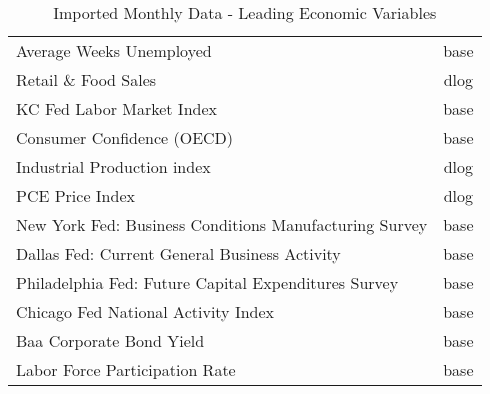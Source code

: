 \documentclass[11pt, letterpaper]{article}\usepackage[]{graphicx}\usepackage[]{color}
\begin{document}
\begin{table}[H]
\begin{tabular}{lc}
  Average Weeks Unemployed & base \\ 
  Retail \& Food Sales & dlog \\ 
  KC Fed Labor Market Index & base \\ 
  Consumer Confidence (OECD) & base \\ 
  Industrial Production index & dlog \\ 
  PCE Price Index & dlog \\ 
  New York Fed: Business Conditions Manufacturing Survey & base \\ 
  Dallas Fed: Current General Business Activity & base \\ 
  Philadelphia Fed: Future Capital Expenditures Survey & base \\ 
  Chicago Fed National Activity Index & base \\ 
  Baa Corporate Bond Yield & base \\ 
  Labor Force Participation Rate & base \\ 
   \hline
\end{tabular}
\endgroup
\caption{Imported Monthly Data - Leading Economic Variables} 
\end{table}
\end{document}
